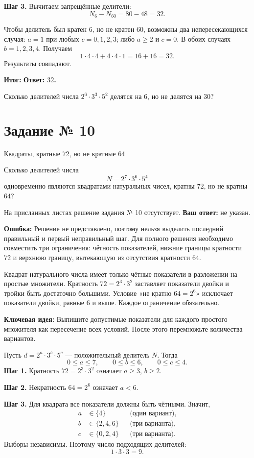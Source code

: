 \documentclass[a4paper,11pt]{article}
\newcommand{\subhead}[1]{\par\vspace{3pt}{\bfseries\textcolor{ink}{#1}}\par\vspace{1pt}}
\newcommand{\errorlabel}{\textcolor{warn}{\textbf{Ошибка:}}}
\newcommand{\keylabel}{\textcolor{keyblue}{\textbf{Ключевая идея:}}}
\newcommand{\finallabel}{\textcolor{accent}{\textbf{Итог:}}}
\newcommand{\tasktitle}[2]{\phantomsection\label{task:#1}\section*{Задание № #1}\textcolor{muted}{#2}\par\vspace{4pt}}
\begin{document}
\textbf{Шаг 3.} Вычитаем запрещённые делители:
\[
N_6-N_{60}=80-48=32.
\]

\subhead{Проверка другим способом}
Чтобы делитель был кратен $6$, но не кратен $60$, возможны два непересекающихся случая: $a=1$ при любых $c=0,1,2,3$; либо $a\ge2$ и $c=0$. В обоих случаях $b=1,2,3,4$. Получаем
\[
1\cdot4\cdot4+4\cdot4\cdot1=16+16=32.
\]
Результаты совпадают.

\finallabel{} \textbf{Ответ: $32$.}

\subhead{Задача на закрепление}
Сколько делителей числа $2^6\cdot3^3\cdot5^2$ делятся на $6$, но не делятся на $30$?

\clearpage
\tasktitle{10}{Квадраты, кратные 72, но не кратные 64}
\subhead{Текст задания}
Сколько делителей числа
\[
N=2^7\cdot3^6\cdot5^4
\]
одновременно являются квадратами натуральных чисел, кратны $72$, но не кратны $64$?

\subhead{Ваше решение и ответ}
На присланных листах решение задания № 10 отсутствует. \textbf{Ваш ответ:} не указан.

\subhead{Где именно возникает затруднение}
\errorlabel{} Решение не представлено, поэтому нельзя выделить последний правильный и первый неправильный шаг. Для полного решения необходимо совместить три ограничения: чётность показателей, нижние границы кратности $72$ и верхнюю границу, вытекающую из отсутствия кратности $64$.

\subhead{Почему важно совместить ограничения}
Квадрат натурального числа имеет только чётные показатели в разложении на простые множители. Кратность $72=2^3\cdot3^2$ заставляет показатели двойки и тройки быть достаточно большими. Условие «не кратно $64=2^6$» исключает показатели двойки, равные $6$ и выше. Каждое ограничение обязательно.

\subhead{Ключевая идея и исправление}
\keylabel{} Выпишите допустимые показатели для каждого простого множителя как пересечение всех условий. После этого перемножьте количества вариантов.

\subhead{Полное правильное решение}
Пусть $d=2^a\cdot3^b\cdot5^c$ --- положительный делитель $N$. Тогда
\[
0\le a\le7,\qquad0\le b\le6,\qquad0\le c\le4.
\]
\textbf{Шаг 1.} Кратность $72=2^3\cdot3^2$ означает $a\ge3$, $b\ge2$.

\textbf{Шаг 2.} Некратность $64=2^6$ означает $a<6$.

\textbf{Шаг 3.} Для квадрата все показатели должны быть чётными. Значит,
\[
\begin{aligned}
a&\in\{4\}&&\text{(один вариант)},\\
b&\in\{2,4,6\}&&\text{(три варианта)},\\
c&\in\{0,2,4\}&&\text{(три варианта)}.
\end{aligned}
\]
Выборы независимы. Поэтому число подходящих делителей:
\[
1\cdot3\cdot3=9.
\]
\end{document}
